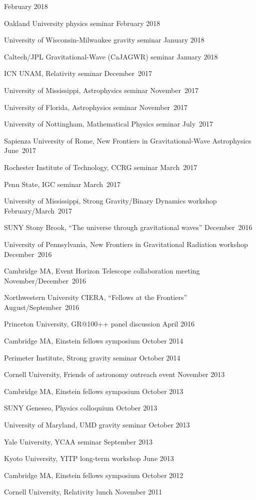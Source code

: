 \begin{etaremune}
  \hfill{}
  February 2018
\item
  Oakland University physics seminar
  \hfill{}
  February 2018
\item
  University of Wisconsin-Milwaukee gravity seminar
  \hfill{}
  January 2018
\item
  Caltech/JPL Gravitational-Wave (CaJAGWR) seminar
  \hfill{}
  January 2018
\item
  ICN UNAM,
  Relativity seminar
  \hfill{}
  December~2017
\item
  University of Mississippi,
  Astrophysics seminar
  \hfill{}
  November~2017
\item
  University of Florida,
  Astrophysics seminar
  \hfill{}
  November~2017
\item
  University of Nottingham,
  Mathematical Physics seminar
  \hfill{}
  July~2017
\item
  Sapienza University of Rome,
  New Frontiers in Gravitational-Wave Astrophysics
  \hfill{}
  June~2017
\item
  Rochester Institute of Technology,
  CCRG seminar
  \hfill{}
  March~2017
\item
  Penn State,
  IGC seminar
  \hfill{}
  March~2017
\item
  University of Mississippi,
  Strong Gravity/Binary Dynamics workshop
  \hfill{}
  February/March~2017
\item
  SUNY Stony Brook,
  ``The universe through gravitational waves''
  \hfill{}
  December~2016
\item
  University of Pennsylvania,
  New Frontiers in Gravitational Radiation workshop
  \hfill{}
  December~2016
\item
  Cambridge MA,
  Event Horizon Telescope collaboration meeting
  \hfill{}
  November/December~2016
\item
  Northwestern University CIERA,
  ``Fellows at the Frontiers''
  \hfill{}
  August/September~2016
\item
  Princeton University,
  GR@100++ panel discussion
  \hfill{}
  April 2016
\item
  Cambridge MA,
  Einstein fellows symposium
  \hfill{}
  October 2014
\item
  Perimeter Institute,
  Strong gravity seminar
  \hfill{}
  October 2014
\item
  Cornell University,
  Friends of astronomy outreach event
  \hfill{}
  November 2013
\item
  Cambridge MA,
  Einstein fellows symposium
  \hfill{}
  October 2013
\item
  SUNY Geneseo,
  Physics colloquium
  \hfill{}
  October 2013
\item
  University of Maryland,
  UMD gravity seminar
  \hfill{}
  October 2013
\item
  Yale University,
  YCAA seminar
  \hfill{}
  September 2013
\item
  Kyoto University,
  YITP long-term workshop
  \hfill{}
  June 2013
\item
  Cambridge MA,
  Einstein fellows symposium
  \hfill{}
  October 2012
\item
  Cornell University,
  Relativity lunch
  \hfill{}
  November 2011
\end{etaremune}


